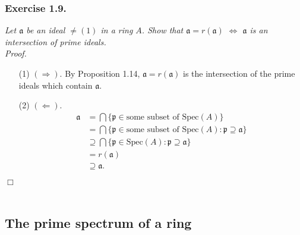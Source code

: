 \documentclass{article}
\begin{document}



\subsubsection*{Exercise 1.9.}
\emph{Let $\mathfrak{a}$ be an ideal $\neq (1)$ in a ring $A$.
Show that $\mathfrak{a} = r(\mathfrak{a})$ $\Longleftrightarrow$
$\mathfrak{a}$ is an intersection of prime ideals.} \\



\emph{Proof.}
\begin{enumerate}
\item[(1)]
  $(\Longrightarrow)$.
  By Proposition 1.14,
  $\mathfrak{a} = r(\mathfrak{a})$ is the intersection of the prime ideals which contain
  $\mathfrak{a}$.

\item[(2)]
  $(\Longleftarrow)$.
  \begin{align*}
    \mathfrak{a}
    &= \bigcap \{ \mathfrak{p} \in \text{some subset of } \mathrm{Spec}(A) \} \\
    &= \bigcap \{ \mathfrak{p} \in \text{some subset of } \mathrm{Spec}(A)
      : \mathfrak{p} \supseteq \mathfrak{a} \} \\
    &\supseteq
    \bigcap \{ \mathfrak{p} \in \mathrm{Spec}(A) : \mathfrak{p} \supseteq \mathfrak{a} \} \\
    &= r(\mathfrak{a}) \\
    &\supseteq \mathfrak{a}.
  \end{align*}
\end{enumerate}
$\Box$ \\\\






\subsection*{The prime spectrum of a ring \\}
\end{document}
